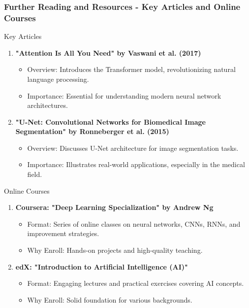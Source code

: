 \documentclass[aspectratio=169]{beamer}
\begin{document}
\begin{frame}[fragile]
    \frametitle{Further Reading and Resources - Key Articles and Online Courses}
    \begin{block}{Key Articles}
        \begin{enumerate}
            \item \textbf{"Attention Is All You Need" by Vaswani et al. (2017)}
            \begin{itemize}
                \item Overview: Introduces the Transformer model, revolutionizing natural language processing.
                \item Importance: Essential for understanding modern neural network architectures.
            \end{itemize}

            \item \textbf{"U-Net: Convolutional Networks for Biomedical Image Segmentation" by Ronneberger et al. (2015)}
            \begin{itemize}
                \item Overview: Discusses U-Net architecture for image segmentation tasks.
                \item Importance: Illustrates real-world applications, especially in the medical field.
            \end{itemize}
        \end{enumerate}
    \end{block}
    
    \begin{block}{Online Courses}
        \begin{enumerate}
            \item \textbf{Coursera: "Deep Learning Specialization" by Andrew Ng}
            \begin{itemize}
                \item Format: Series of online classes on neural networks, CNNs, RNNs, and improvement strategies.
                \item Why Enroll: Hands-on projects and high-quality teaching.
            \end{itemize}

            \item \textbf{edX: "Introduction to Artificial Intelligence (AI)"}
            \begin{itemize}
                \item Format: Engaging lectures and practical exercises covering AI concepts.
                \item Why Enroll: Solid foundation for various backgrounds.
            \end{itemize}
        \end{enumerate}
    \end{block}
\end{frame}
\end{document}
